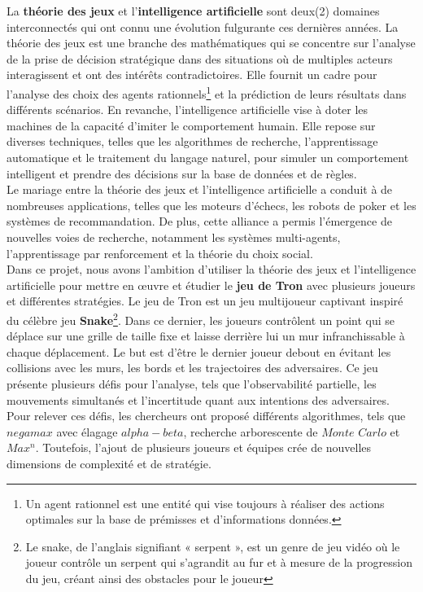 La \textbf{théorie des jeux} et l'\textbf{intelligence artificielle} sont deux(2) domaines 
interconnectés qui ont connu une évolution fulgurante ces dernières années. La théorie des 
jeux est une branche des mathématiques qui se concentre sur l'analyse de la prise de décision 
stratégique dans des situations où de multiples acteurs interagissent et ont des intérêts 
contradictoires. Elle fournit un cadre pour l'analyse des choix des agents rationnels\footnote{Un 
agent rationnel est une entité qui vise toujours à réaliser des actions optimales sur la base de 
prémisses et d’informations données.} et la prédiction de leurs résultats dans différents scénarios. 
En revanche, l'intelligence artificielle vise à doter les machines de la capacité d'imiter le 
comportement humain. Elle repose sur diverses techniques, telles que les algorithmes de recherche, 
l'apprentissage automatique et le traitement du langage naturel, pour simuler un comportement 
intelligent et prendre des décisions sur la base de données et de règles.\\

Le mariage entre la théorie des jeux et l'intelligence artificielle a conduit à de nombreuses 
applications, telles que les moteurs d'échecs, les robots de poker et les systèmes de recommandation. 
De plus, cette alliance a permis l'émergence de nouvelles voies de recherche, notamment les systèmes 
multi-agents, l'apprentissage par renforcement et la théorie du choix social.\\ 

Dans ce projet, nous avons l'ambition d'utiliser la théorie des jeux et l'intelligence artificielle 
pour mettre en œuvre et étudier le \textbf{jeu de Tron} avec plusieurs joueurs et différentes stratégies. Le jeu de Tron 
est un jeu multijoueur captivant inspiré du célèbre jeu \textbf{Snake}\footnote{Le snake, de 
l’anglais signifiant « serpent », est un genre de jeu vidéo où le joueur contrôle un serpent 
qui s’agrandit au fur et à mesure de la progression du jeu, créant ainsi des obstacles pour le joueur}.
Dans ce dernier, les joueurs contrôlent un point qui se déplace sur une grille de taille fixe et laisse 
derrière lui un mur infranchissable à chaque déplacement. Le but est d'être le dernier joueur debout 
en évitant les collisions avec les murs, les bords et les trajectoires des adversaires. Ce jeu 
présente plusieurs défis pour l'analyse, tels que l'observabilité partielle, les mouvements 
simultanés et l'incertitude quant aux intentions des adversaires. Pour relever ces défis, les 
chercheurs ont proposé différents algorithmes, tels que $negamax$ avec élagage $alpha-beta$, 
recherche arborescente de $Monte$ $Carlo$ et $Max^n$. Toutefois, l'ajout de plusieurs joueurs et équipes 
crée de nouvelles dimensions de complexité et de stratégie.\\


